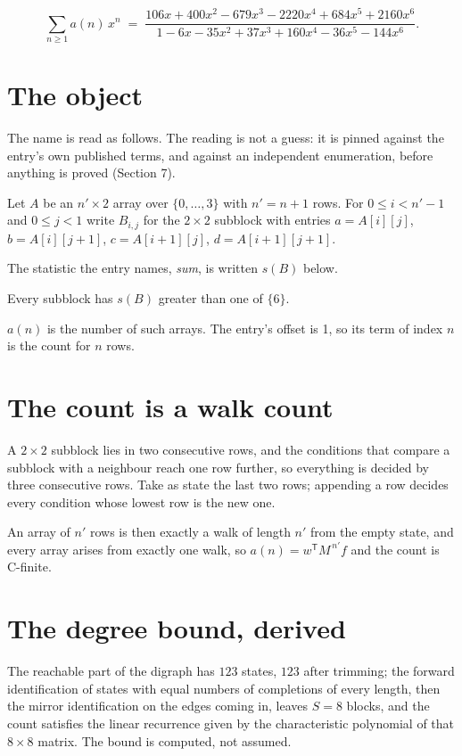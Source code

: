 \documentclass[11pt]{article}
\theoremstyle{definition}
\begin{document}
\[\sum_{n \ge 1} a(n)\,x^n \;=\; \frac{106x + 400x^{2} - 679x^{3} - 2220x^{4} + 684x^{5} + 2160x^{6}}{1 - 6x - 35x^{2} + 37x^{3} + 160x^{4} - 36x^{5} - 144x^{6}}.\]

\section{The object}

The name is read as follows. The reading is not a guess: it is pinned against the entry's own published terms, and against an independent enumeration, before anything is proved (Section 7).

Let $A$ be an $n' \times 2$ array over $\{0,\dots,3\}$ with $n' = n + 1$ rows. For $0 \le i < n'-1$ and $0 \le j < 1$ write $B_{i,j}$ for the $2\times2$ subblock with entries $a = A[i][j]$, $b = A[i][j{+}1]$, $c = A[i{+}1][j]$, $d = A[i{+}1][j{+}1]$.

The statistic the entry names, {\itshape sum}, is written $s(B)$ below.

Every subblock has $s(B)$ greater than one of $\{6\}$.

$a(n)$ is the number of such arrays. The entry's offset is 1, so its term of index $n$ is the count for $n$ rows.

\section{The count is a walk count}

A $2\times2$ subblock lies in two consecutive rows, and the conditions that compare a subblock with a neighbour reach one row further, so everything is decided by three consecutive rows. Take as state the last two rows; appending a row decides every condition whose lowest row is the new one.

An array of $n'$ rows is then exactly a walk of length $n'$ from the empty state, and every array arises from exactly one walk, so $a(n) = w^{\mathsf T}M^{\,n'}f$ and the count is C-finite.

\section{The degree bound, derived}

The reachable part of the digraph has $123$ states, $123$ after trimming; the forward identification of states with equal numbers of completions of every length, then the mirror identification on the edges coming in, leaves $S = 8$ blocks, and the count satisfies the linear recurrence given by the characteristic polynomial of that $8\times8$ matrix. The bound is computed, not assumed.
\end{document}
